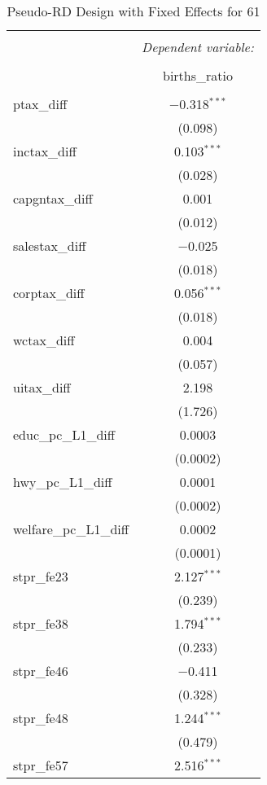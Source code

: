 
\begin{table}[!htbp] \centering 
  \caption{Pseudo-RD Design with Fixed Effects for  61} 
  \label{} 
\begin{tabular}{@{\extracolsep{5pt}}lc} 
\\[-1.8ex]\hline 
\hline \\[-1.8ex] 
 & \multicolumn{1}{c}{\textit{Dependent variable:}} \\ 
\cline{2-2} 
\\[-1.8ex] & births\_ratio \\ 
\hline \\[-1.8ex] 
 ptax\_diff & $-$0.318$^{***}$ \\ 
  & (0.098) \\ 
  inctax\_diff & 0.103$^{***}$ \\ 
  & (0.028) \\ 
  capgntax\_diff & 0.001 \\ 
  & (0.012) \\ 
  salestax\_diff & $-$0.025 \\ 
  & (0.018) \\ 
  corptax\_diff & 0.056$^{***}$ \\ 
  & (0.018) \\ 
  wctax\_diff & 0.004 \\ 
  & (0.057) \\ 
  uitax\_diff & 2.198 \\ 
  & (1.726) \\ 
  educ\_pc\_L1\_diff & 0.0003 \\ 
  & (0.0002) \\ 
  hwy\_pc\_L1\_diff & 0.0001 \\ 
  & (0.0002) \\ 
  welfare\_pc\_L1\_diff & 0.0002 \\ 
  & (0.0001) \\ 
  stpr\_fe23 & 2.127$^{***}$ \\ 
  & (0.239) \\ 
  stpr\_fe38 & 1.794$^{***}$ \\ 
  & (0.233) \\ 
  stpr\_fe46 & $-$0.411 \\ 
  & (0.328) \\ 
  stpr\_fe48 & 1.244$^{***}$ \\ 
  & (0.479) \\ 
  stpr\_fe57 & 2.516$^{***}$ \\ 

\end{tabular}
\end{table}
